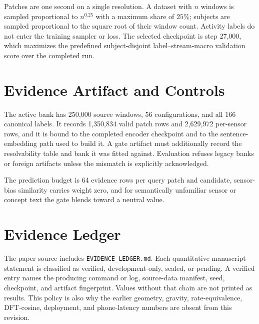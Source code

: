 Patches are one second on a single resolution. A dataset with $n$ windows is sampled proportional to
$n^{0.25}$ with a maximum share of $25\%$; subjects are sampled proportional to the square root of
their window count. Activity labels do not enter the training sampler or loss. The selected
checkpoint is step 27,000, which maximizes the predefined subject-disjoint label--stream-macro
validation score over the completed run.

\section{Evidence Artifact and Controls}
\label{app:phaseb}

The active bank has 250,000 source windows, 56 configurations, and all 166 canonical labels. It
records 1,350,834 valid patch rows and 2,629,972 per-sensor rows, and it is bound to the completed
encoder checkpoint and to the sentence-embedding path used to build it. A gate artifact must
additionally record the resolvability table and bank it was fitted against. Evaluation refuses
legacy banks or foreign artifacts unless the mismatch is explicitly acknowledged.

The prediction budget is 64 evidence rows per query patch and candidate, sensor-bias similarity
carries weight zero, and for semantically unfamiliar sensor or concept text the gate blends toward a
neutral value.


\section{Evidence Ledger}
\label{app:ledger}

The paper source includes \texttt{EVIDENCE\_LEDGER.md}. Each quantitative manuscript statement is
classified as verified, development-only, sealed, or pending. A verified entry names the producing
command or log, source-data manifest, seed, checkpoint, and artifact fingerprint. Values without
that chain are not printed as results. This policy is also why the earlier geometry, gravity,
rate-equivalence, DFT-cosine, deployment, and phone-latency numbers are absent from this revision.
